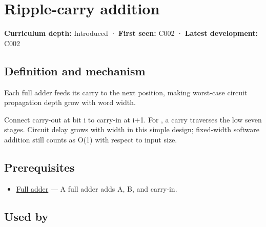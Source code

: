 \hypertarget{appendix-17917d9fdbe3}{}\label{referencestart:appendix-17917d9fdbe3}
\section{Ripple-carry addition}\label{appendix-17917d9fdbe3-ripple-carry-addition}

\hypertarget{appendix-17917d9fdbe3-ripple-carry-addition}{}

\textbf{Curriculum depth:} Introduced · \textbf{First seen:} C002 · \textbf{Latest development:} C002

\begin{allmightroledefinition}

\subsection{Definition and mechanism}\label{appendix-17917d9fdbe3-definition-and-mechanism}

\hypertarget{appendix-17917d9fdbe3-definition-and-mechanism}{}

Each full adder feeds its carry to the next position, making worst-case circuit propagation depth grow with word width.

\end{allmightroledefinition}

Connect carry-out at bit i to carry-in at i+1. For , a carry traverses the low seven stages. Circuit delay grows with width in this simple design; fixed-width software addition still counts as O(1) with respect to input size.

\subsection{Prerequisites}\label{appendix-17917d9fdbe3-prerequisites}

\hypertarget{appendix-17917d9fdbe3-prerequisites}{}

\begin{itemize}
\tightlist
\item
  \hyperref[appendix-d1a5b1e520c2]{Full adder} --- A full adder adds A, B, and carry-in.
\end{itemize}

\subsection{Used by}\label{appendix-17917d9fdbe3-used-by}

